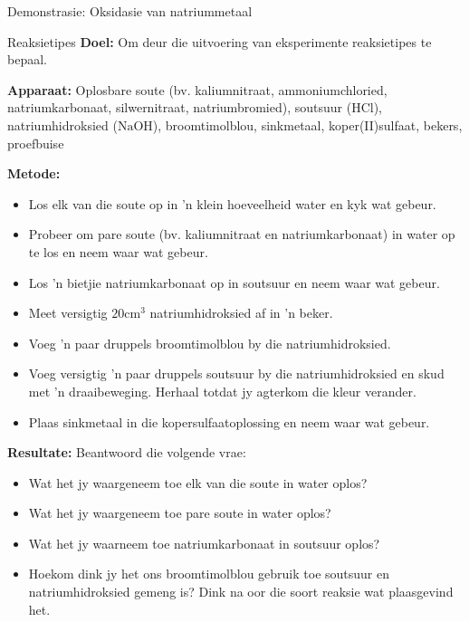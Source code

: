 {{\begin{g_experiment}{Demonstrasie: Oksidasie van natriummetaal}
\end{g_experiment}
	\par
\label{m38719*eip-611}
            \begin{g_experiment}{Reaksietipes}
            \nopagebreak
            \label{m38719*eip-190}\noindent{}\textbf{Doel: }\newline
   Om deur die uitvoering van eksperimente reaksietipes te bepaal.
\par 
\label{m38719*eip-1901}\noindent{}\textbf{Apparaat: }\newline
Oplosbare soute (bv. kaliumnitraat, ammoniumchloried, natriumkarbonaat, silwernitraat, natriumbromied), soutsuur ($\text{HCl}$), natriumhidroksied ($\text{NaOH}$), broomtimolblou, sinkmetaal, koper(II)sulfaat, bekers, proefbuise
\par 
\label{m38719*eip-1902}\noindent{}\textbf{Metode: }\label{m38719*id6231}\begin{itemize}[noitemsep]
            \item Los elk van die soute op in  'n klein hoeveelheid water en kyk wat gebeur.
\item Probeer om pare soute (bv. kaliumnitraat en natriumkarbonaat) in water op te los en neem waar wat gebeur.
\item Los   'n bietjie natriumkarbonaat op in soutsuur en neem waar wat gebeur.
\item Meet versigtig $20{\text{cm}}^{3}$ natriumhidroksied af in  'n beker. 
\item Voeg  'n paar druppels broomtimolblou by die natriumhidroksied.
\item Voeg versigtig  'n paar druppels soutsuur by die natriumhidroksied en skud met   'n draaibeweging. Herhaal totdat jy agterkom die kleur verander.
\item Plaas sinkmetaal in die kopersulfaatoplossing en neem waar wat gebeur.
\end{itemize}
\par 
\label{m38719*eip-1903}\noindent{}\textbf{Resultate: }\newline
    Beantwoord die volgende vrae:
\label{m38719*id6144}\begin{itemize}[noitemsep]
\item Wat het jy waargeneem toe elk van die soute in water oplos?
\item Wat het jy waargeneem toe pare soute in water oplos?
\item Wat het jy waarneem toe natriumkarbonaat in soutsuur oplos?
\item Hoekom dink jy het ons broomtimolblou gebruik toe soutsuur en natriumhidroksied gemeng is? Dink na oor die soort reaksie wat plaasgevind het.

\end{itemize}
\end{g_experiment}}}
